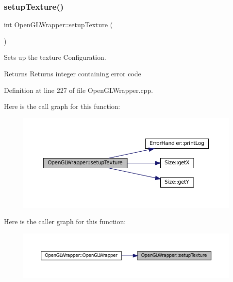\subsubsection{\texorpdfstring{setupTexture()}{setupTexture()}}
{\footnotesize\ttfamily int Open\+G\+L\+Wrapper\+::setup\+Texture (\begin{DoxyParamCaption}{ }\end{DoxyParamCaption})\hspace{0.3cm}{\ttfamily [private]}}



Sets up the texture Configuration. 

\begin{DoxyReturn}{Returns}
Returns integer containing error code 
\end{DoxyReturn}


Definition at line 227 of file Open\+G\+L\+Wrapper.\+cpp.

Here is the call graph for this function\+:\nopagebreak
\begin{figure}[H]
\begin{center}
\leavevmode
\includegraphics[width=350pt]{classOpenGLWrapper_a9f2ce92894cb84914b73349c88bb6fef_cgraph}
\end{center}
\end{figure}
Here is the caller graph for this function\+:\nopagebreak
\begin{figure}[H]
\begin{center}
\leavevmode
\includegraphics[width=350pt]{classOpenGLWrapper_a9f2ce92894cb84914b73349c88bb6fef_icgraph}
\end{center}
\end{figure}


